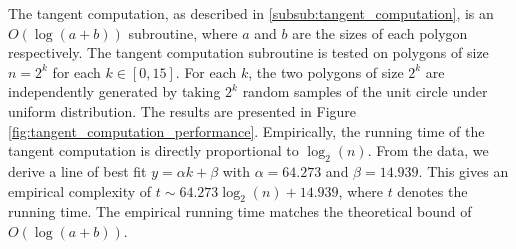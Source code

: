 \documentclass{article}
\newcommand{\figref}[1]{Figure \ref{#1}}
\begin{document}
The tangent computation, as described in \ref{subsub:tangent_computation}, is an $O(\log(a + b))$ subroutine, where $a$ and $b$ are the sizes of each polygon respectively. The tangent computation subroutine is tested on polygons of size $n = 2^k$ for each $k \in [0, 15]$. For each $k$, the two polygons of size $2^k$ are independently generated by taking $2^k$ random samples of the unit circle under uniform distribution. The results are presented in \figref{fig:tangent_computation_performance}. Empirically, the running time of the tangent computation is directly proportional to $\log_2(n)$. From the data, we derive a line of best fit $y = \alpha k + \beta$ with $\alpha = 64.273$ and $\beta = 14.939$. This gives an empirical complexity of $t \sim 64.273 \log_2 (n) + 14.939$, where $t$ denotes the running time. The empirical running time matches the theoretical bound of $O(\log(a+b))$.
\end{document}
